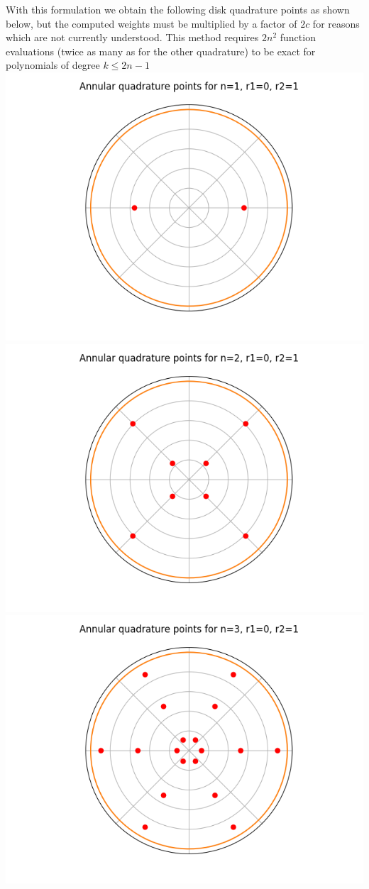 \documentclass[10pt,a4paper]{letter}
\begin{document}
With this formulation we obtain the following disk quadrature points as shown below, but the computed weights must be multiplied by a factor of $2c$ for reasons which are not currently understood.  This method requires $2n^2$ function evaluations (twice as many as for the other quadrature) to be exact for polynomials of degree $k \leq 2n-1$ \\

\includegraphics[scale=.5]{disk_n1}
\includegraphics[scale=.5]{disk_n2}
\includegraphics[scale=.5]{disk_n3}
\end{document}
